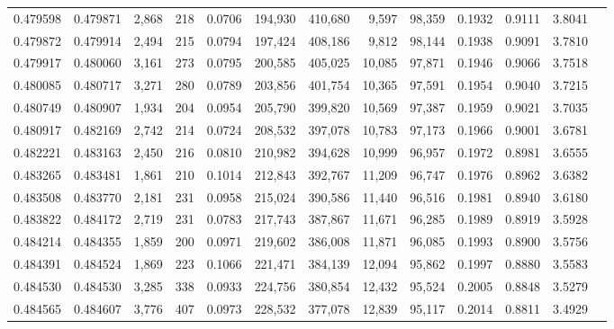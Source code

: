 \begin{tabular}{rrrrrrrrrrrrr}
0.479598 & 0.479871 &  2,868 &   218 &                                     0.0706 & 194,930 & 410,680 &   9,597 &  98,359 & 0.1932 & 0.9111 & 3.8041 \\
0.479872 & 0.479914 &  2,494 &   215 &                                     0.0794 & 197,424 & 408,186 &   9,812 &  98,144 & 0.1938 & 0.9091 & 3.7810 \\
0.479917 & 0.480060 &  3,161 &   273 &                                     0.0795 & 200,585 & 405,025 &  10,085 &  97,871 & 0.1946 & 0.9066 & 3.7518 \\
0.480085 & 0.480717 &  3,271 &   280 &                                     0.0789 & 203,856 & 401,754 &  10,365 &  97,591 & 0.1954 & 0.9040 & 3.7215 \\
0.480749 & 0.480907 &  1,934 &   204 &                                     0.0954 & 205,790 & 399,820 &  10,569 &  97,387 & 0.1959 & 0.9021 & 3.7035 \\
0.480917 & 0.482169 &  2,742 &   214 &                                     0.0724 & 208,532 & 397,078 &  10,783 &  97,173 & 0.1966 & 0.9001 & 3.6781 \\
0.482221 & 0.483163 &  2,450 &   216 &                                     0.0810 & 210,982 & 394,628 &  10,999 &  96,957 & 0.1972 & 0.8981 & 3.6555 \\
0.483265 & 0.483481 &  1,861 &   210 &                                     0.1014 & 212,843 & 392,767 &  11,209 &  96,747 & 0.1976 & 0.8962 & 3.6382 \\
0.483508 & 0.483770 &  2,181 &   231 &                                     0.0958 & 215,024 & 390,586 &  11,440 &  96,516 & 0.1981 & 0.8940 & 3.6180 \\
0.483822 & 0.484172 &  2,719 &   231 &                                     0.0783 & 217,743 & 387,867 &  11,671 &  96,285 & 0.1989 & 0.8919 & 3.5928 \\
0.484214 & 0.484355 &  1,859 &   200 &                                     0.0971 & 219,602 & 386,008 &  11,871 &  96,085 & 0.1993 & 0.8900 & 3.5756 \\
0.484391 & 0.484524 &  1,869 &   223 &                                     0.1066 & 221,471 & 384,139 &  12,094 &  95,862 & 0.1997 & 0.8880 & 3.5583 \\
0.484530 & 0.484530 &  3,285 &   338 &                                     0.0933 & 224,756 & 380,854 &  12,432 &  95,524 & 0.2005 & 0.8848 & 3.5279 \\
0.484565 & 0.484607 &  3,776 &   407 &                                     0.0973 & 228,532 & 377,078 &  12,839 &  95,117 & 0.2014 & 0.8811 & 3.4929 \\

\end{tabular}
